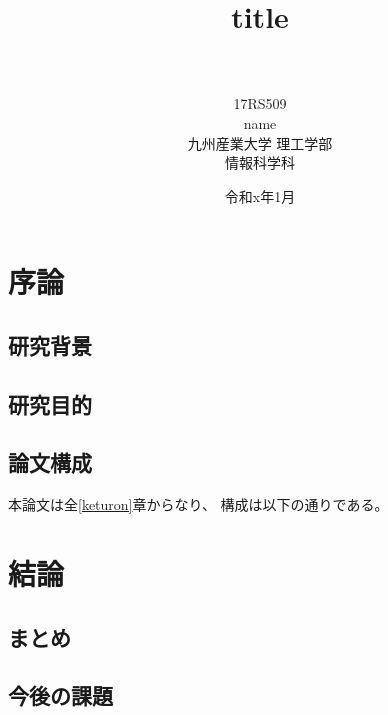 \documentclass[a4j,12pt,onecolumn,oneside,titlepage,openany,final]{jreport}
\title{
 \Huge{title}\\
 \vspace{5.5cm}\\
}
\author{\LARGE{17RS509}\vspace{0.5cm}\\
\LARGE{name}\vspace{2cm}\\
\LARGE{九州産業大学 理工学部}\vspace{0.5cm}\\
\LARGE{情報科学科}\vspace{1cm}\\
}
\date{\LARGE{令和x年1月}}
\begin{document}
\maketitle
\tableofcontents
\listoffigures
\listoftables


\chapter{序論}\label{chap:joron}

\section{研究背景}\label{sec:haikei}
    
\section{研究目的}\label{sec:mokuteki}

\section{論文構成}\label{sec:kousei}

本論文は全\ref{keturon}章からなり、
構成は以下の通りである。


\chapter{}\label{chap:x}


\chapter{結論}\label{chap:keturon}

\section{まとめ}\label{sec:matome}
 
\section{今後の課題}\label{sec:kadai}
\end{document}
